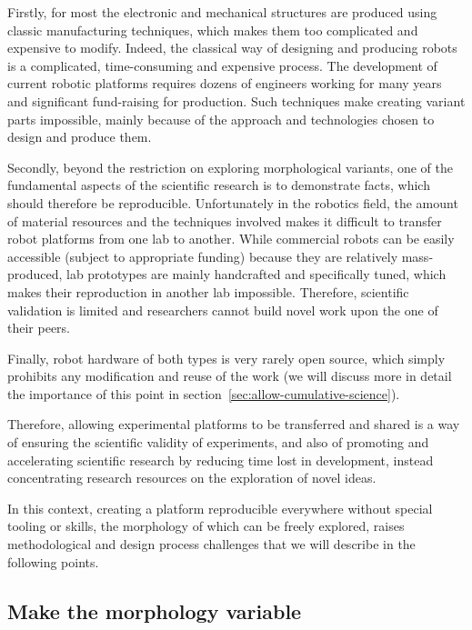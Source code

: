 Firstly, for most the electronic and mechanical structures are produced using classic manufacturing techniques,  which makes them too complicated and expensive to modify. Indeed, the classical way of designing and producing robots is a complicated, time-consuming and expensive process. The development of current robotic platforms requires dozens of engineers working for many years and significant fund-raising for production. Such techniques make creating variant parts impossible, mainly because of the approach and technologies chosen to design and produce them.


Secondly, beyond the restriction on exploring morphological variants, one of the fundamental aspects of the scientific research is to demonstrate facts, which should therefore be reproducible. Unfortunately in the robotics field, the amount of material resources and the techniques involved makes it difficult to transfer robot platforms from one lab to another. While commercial robots can be easily accessible (subject to appropriate funding) because they are relatively mass-produced, lab prototypes are mainly handcrafted and specifically tuned, which makes their  reproduction in another lab impossible. Therefore, scientific validation is limited and researchers cannot build novel work upon the one of their peers.

Finally, robot hardware of both types is very rarely open source, which simply prohibits any modification and reuse of the work (we will discuss more in detail the importance of this point in section~\ref{sec:allow-cumulative-science}).

Therefore, allowing  experimental platforms to be transferred and shared is a way of ensuring the scientific validity of experiments, and also of promoting and accelerating scientific research by reducing time lost in development, instead concentrating research resources on the exploration of novel ideas.


In this context, creating a platform reproducible everywhere without special tooling or skills, the morphology of which can be freely explored, raises methodological and design process challenges that we will describe in the following points.

\subsection{Make the morphology variable} %

